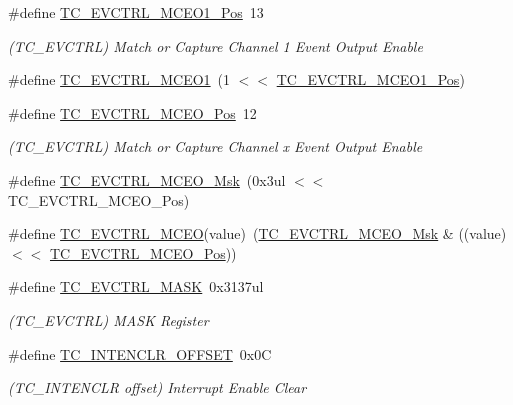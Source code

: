 \begin{DoxyCompactItemize}
\item 
\#define \mbox{\hyperlink{group___s_a_m_d21___t_c_ga17ba305f7c87565868668e0aec74b48c}{T\+C\+\_\+\+E\+V\+C\+T\+R\+L\+\_\+\+M\+C\+E\+O1\+\_\+\+Pos}}~13
\begin{DoxyCompactList}\small\item\em (T\+C\+\_\+\+E\+V\+C\+T\+RL) Match or Capture Channel 1 Event Output Enable \end{DoxyCompactList}\item 
\#define \mbox{\hyperlink{group___s_a_m_d21___t_c_gae89ffea0c2e929379331ff3eb8e14ea1}{T\+C\+\_\+\+E\+V\+C\+T\+R\+L\+\_\+\+M\+C\+E\+O1}}~(1 $<$$<$ \mbox{\hyperlink{group___s_a_m_d21___t_c_ga17ba305f7c87565868668e0aec74b48c}{T\+C\+\_\+\+E\+V\+C\+T\+R\+L\+\_\+\+M\+C\+E\+O1\+\_\+\+Pos}})
\item 
\#define \mbox{\hyperlink{group___s_a_m_d21___t_c_ga1d8a09101193dedc3736a23697bd4909}{T\+C\+\_\+\+E\+V\+C\+T\+R\+L\+\_\+\+M\+C\+E\+O\+\_\+\+Pos}}~12
\begin{DoxyCompactList}\small\item\em (T\+C\+\_\+\+E\+V\+C\+T\+RL) Match or Capture Channel x Event Output Enable \end{DoxyCompactList}\item 
\#define \mbox{\hyperlink{group___s_a_m_d21___t_c_ga559fcfaeb425e5b9f7202c54c90211d2}{T\+C\+\_\+\+E\+V\+C\+T\+R\+L\+\_\+\+M\+C\+E\+O\+\_\+\+Msk}}~(0x3ul $<$$<$ T\+C\+\_\+\+E\+V\+C\+T\+R\+L\+\_\+\+M\+C\+E\+O\+\_\+\+Pos)
\item 
\#define \mbox{\hyperlink{group___s_a_m_d21___t_c_ga991d2330782b614efdc5700652f82011}{T\+C\+\_\+\+E\+V\+C\+T\+R\+L\+\_\+\+M\+C\+EO}}(value)~(\mbox{\hyperlink{group___s_a_m_d21___t_c_ga559fcfaeb425e5b9f7202c54c90211d2}{T\+C\+\_\+\+E\+V\+C\+T\+R\+L\+\_\+\+M\+C\+E\+O\+\_\+\+Msk}} \& ((value) $<$$<$ \mbox{\hyperlink{group___s_a_m_d21___t_c_ga1d8a09101193dedc3736a23697bd4909}{T\+C\+\_\+\+E\+V\+C\+T\+R\+L\+\_\+\+M\+C\+E\+O\+\_\+\+Pos}}))
\item 
\#define \mbox{\hyperlink{group___s_a_m_d21___t_c_ga317a47bc3562fba35f3c759ee8c26b47}{T\+C\+\_\+\+E\+V\+C\+T\+R\+L\+\_\+\+M\+A\+SK}}~0x3137ul
\begin{DoxyCompactList}\small\item\em (T\+C\+\_\+\+E\+V\+C\+T\+RL) M\+A\+SK Register \end{DoxyCompactList}\item 
\#define \mbox{\hyperlink{group___s_a_m_d21___t_c_ga4e6711338c10a71c069a50745717a03c}{T\+C\+\_\+\+I\+N\+T\+E\+N\+C\+L\+R\+\_\+\+O\+F\+F\+S\+ET}}~0x0C
\begin{DoxyCompactList}\small\item\em (T\+C\+\_\+\+I\+N\+T\+E\+N\+C\+LR offset) Interrupt Enable Clear \end{DoxyCompactList}\item 
$$
\end{DoxyCompactItemize}
